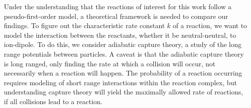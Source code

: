 Under the understanding that the reactions of interest for this work follow a pseudo-first-order model, a theoretical framework is needed to compare our findings. To figure out the characteristic rate constant $k$ of a reaction, we want to model the interaction between the reactants, whether it be neutral-neutral, to ion-dipole. To do this, we consider adiabatic capture theory, a study of the long range potentials between particles. A caveat is that the adiabatic capture theory is long ranged, only finding the rate at which a collision will occur, not necessarily when a reaction will happen. The probability of a reaction occurring requires modeling of short range interactions within the reaction complex, but understanding capture theory will yield the maximally allowed rate of reactions, if all collisions lead to a reaction.

